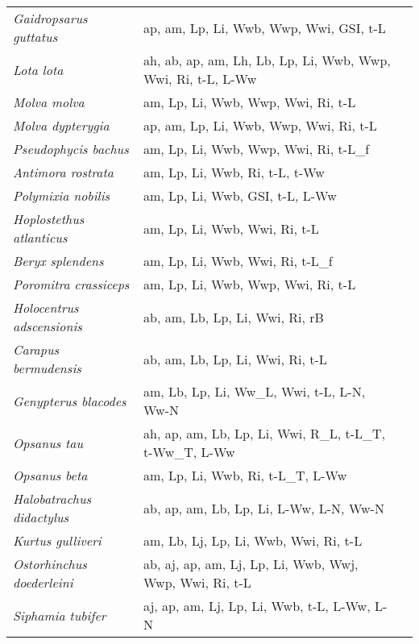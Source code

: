 {\begin{longtable}[c]{p{3.5cm}p{5.5cm}p{5.5cm}}
\emph{Gaidropsarus guttatus} &  ap, am, Lp, Li, Wwb, Wwp, Wwi, GSI, t-L & \citet{MoraAfon2003} \\
\emph{Lota lota} &  ah, ab, ap, am, Lh, Lb, Lp, Li, Wwb, Wwp, Wwi, Ri, t-L, L-Ww & \citet{KuprTrab2014,SemdSkor2015} \\
\emph{Molva molva} &  am, Lp, Li, Wwb, Wwp, Wwi, Ri, t-L & \citet{MunkNiel2005,Magn2007} \\
\emph{Molva dypterygia} &  ap, am, Lp, Li, Wwb, Wwp, Wwi, Ri, t-L & \citet{MunkNiel2005,Magn2007} \\
\emph{Pseudophycis bachus} &  am, Lp, Li, Wwb, Wwp, Wwi, Ri, t-L\_f & \citet{KempJenk2013} \\
\emph{Antimora rostrata} &  am, Lp, Li, Wwb, Ri, t-L, t-Ww & \citet{OrloVedi2018} \\
\emph{Polymixia nobilis} &  am, Lp, Li, Wwb, GSI, t-L, L-Ww & \citet{GarcTuse2010} \\
\emph{Hoplostethus atlanticus} &  am, Lp, Li, Wwb, Wwi, Ri, t-L & \citet{AllaLora2000} \\
\emph{Beryx splendens} &  am, Lp, Li, Wwb, Wwi, Ri, t-L\_f & \citet{LeisCars2000,RicoLore2001} \\
\emph{Poromitra crassiceps} &  am, Lp, Li, Wwb, Wwp, Wwi, Ri, t-L & \citet{ChilTayl1980} \\
\emph{Holocentrus adscensionis} &  ab, am, Lb, Lp, Li, Wwi, Ri, rB & \citet{ShinoHazi2007} \\
\emph{Carapus bermudensis} &  ab, am, Lb, Lp, Li, Wwi, Ri, t-L & \citet{SmitTyle1981,GlynEnoc2008} \\
\emph{Genypterus blacodes} &  am, Lb, Lp, Li, Ww\_L, Wwi, t-L, L-N, Ww-N & \citet{BakeWiff2014,CrecZint2015,WiffOjed2007,PareBrav2005} \\
\emph{Opsanus tau} &  ah, ap, am, Lb, Lp, Li, Wwi, R\_L, t-L\_T, t-Ww\_T, L-Ww & \citet{MensStep2001,PalaSara2001,Dove1960,SwarEnge1968} \\
\emph{Opsanus beta} &  am, Lp, Li, Wwb, Ri, t-L\_T, L-Ww & \citet{MalcBari2009} \\
\emph{Halobatrachus didactylus} &  ab, ap, am, Lb, Lp, Li, L-Ww, L-N, Ww-N & \citet{PalaSara2001} \\
\emph{Kurtus gulliveri} &  am, Lb, Lj, Lp, Li, Wwb, Wwi, Ri, t-L & \citet{BerrAday2004,BerrNeir2003} \\
\emph{Ostorhinchus doederleini} &  ab, aj, ap, am, Lj, Lp, Li, Wwb, Wwj, Wwp, Wwi, Ri, t-L & \citet{KingFinn2014} \\
\emph{Siphamia tubifer} &  aj, ap, am, Lj, Lp, Li, Wwb, t-L, L-Ww, L-N & \citet{GoulDoug2016} \\

\end{longtable}}

